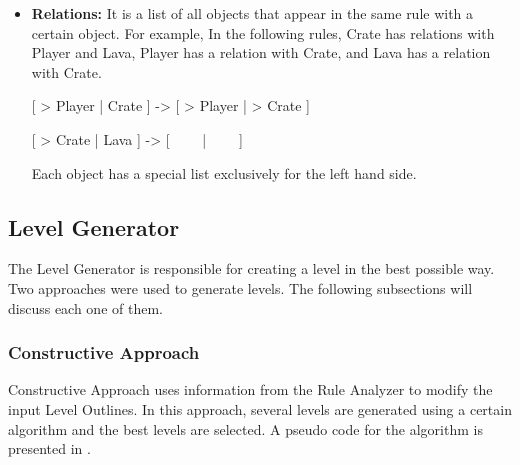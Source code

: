 \begin{itemize}
	\begin{center}
		[ > Player | \ \ \ \ ] -> [ Crate | Player ]
	\end{center}
	\begin{center}
		[ > Crate | Crate ] -> [ > Crate | > Crate ]
	\end{center}
	\begin{center}
		[ Gem | Crate | Gem ] -> [ Crate | Crate | Crate ]
	\end{center}
	The number of Crate objects in each rule are 0, 2, 1 respectively. In normal case, the minimum required number of Crate object will be 2. Crate object have Create behavior (in both the first and the third rule) then the minimum required number of objects will be zero instead.
	\item \textbf{Relations:} It is a list of all objects that appear in the same rule with a certain object. For example, In the following rules, Crate has relations with Player and Lava, Player has a relation with Crate, and Lava has a relation with Crate.
	\begin{center}
		[ > Player | Crate ] -> [ > Player | > Crate ]
	\end{center}
	\begin{center}
		[ > Crate | Lava ] -> [ \ \ \ \ | \ \ \ \ ]
	\end{center}
	Each object has a special list exclusively for the left hand side.	
\end{itemize}

\subsection{Level Generator}
The Level Generator is responsible for creating a level in the best possible way. Two approaches were used to generate levels. The following subsections will discuss each one of them.

\subsubsection{Constructive Approach}
Constructive Approach uses information from the Rule Analyzer to modify the input Level Outlines. In this approach, several levels are generated using a certain algorithm and the best levels are selected. A pseudo code for the algorithm is presented in .\\

